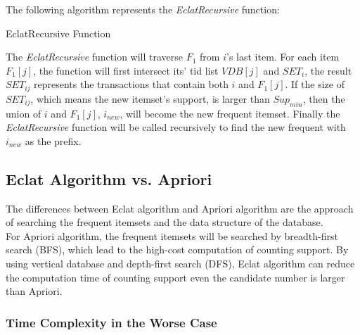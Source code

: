 \documentclass[a4paper, oneside, final, 12pt]{scrartcl} %
\begin{document}
The following algorithm represents the \emph{EclatRecursive} function:

\begin{algorithm}
  \caption{EclatRecursive Function}

  \BlankLine
\end{algorithm}

The \emph{EclatRecursive} function will traverse $F_1$ from $i$'s last item.
For each item $F_1[j]$, the function will first intersect its' tid list $VDB[j]$
and $SET_{i}$, the result $SET_{ij}$ represents the transactions that contain both $i$ and $F_1[j]$.
If the size of $SET_{ij}$, which means the new itemset's support, is larger than $Sup_{min}$,
then the union of $i$ and $F_1[j]$, $i_{new}$, will become the new frequent itemset.
Finally the \emph{EclatRecursive} function will be called recursively
to find the new frequent with $i_{new}$ as the prefix. \\

\subsection{Eclat Algorithm vs. Apriori}

The differences between Eclat algorithm and Apriori algorithm are the approach of
searching the frequent itemsets and the data structure of the database. \\
For Apriori algorithm, the frequent itemsets will be searched by breadth-first search (BFS),
which lead to the high-cost computation of counting support. 
By using vertical database and depth-first search (DFS), 
Eclat algorithm can reduce the computation time of counting support 
even the candidate number is larger than Apriori.

\subsubsection{Time Complexity in the Worse Case}\label{time_complexity}
\end{document}
